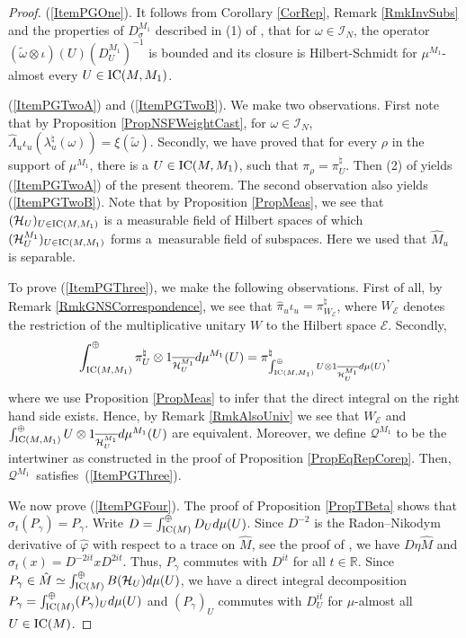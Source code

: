 \documentclass[pdftex]{sigma}
\numberwithin{equation}{section}
\theoremstyle{definition}
\newcommand{\cHil}{\mathcal{H}}
\newcommand{\ICM}{\text{\rm IC}(M)}
\newcommand{\ICMM}{\text{\rm IC}(M, M_1)}
\begin{document}
\begin{proof}
(\ref{ItemPGOne}). It follows from  Corollary \ref{CorRep}, Remark \ref{RmkInvSubs} and the properties of $D_\sigma^{M_1}$ described in (1) of \cite[Theorem 3.4.5]{Des}, that for $\omega \in \mathcal{I}_N$, the operator $(\tilde{\omega} \otimes \iota)(U) (D_U^{M_1})^{-1}$ is bounded and its closure is Hilbert-Schmidt for $\mu^{M_1}$-almost every $U \in \ICMM$.

(\ref{ItemPGTwoA}) and (\ref{ItemPGTwoB}). We make two observations. First note that by  Proposition \ref{PropNSFWeightCast}, for $\omega \in \mathcal{I}_N$,
$
\hat{\Lambda}_u \iota_u( \lambda_u^\natural(\omega))  = \xi(\tilde{\omega}).
$
Secondly, we have proved that for every $\rho$ in the support of $\mu^{M_1}$, there is a $U \in \ICMM$, such that $\pi_\rho = \pi_U^\natural$. Then (2) of \cite[Theorem 3.4.5]{Des} yields (\ref{ItemPGTwoA}) of the present theorem. The second observation also yields (\ref{ItemPGTwoB}). Note that by Proposition \ref{PropMeas}, we see that $(\cHil_U)_{U \in \ICMM}$ is a measurable f\/ield of Hilbert spaces of which $(\cHil_U^{M_1})_{U \in \ICMM}$ forms a~measurable f\/ield of subspaces. Here we used that $\hat{M}_u$ is separable.


To prove (\ref{ItemPGThree}), we make the following observations. First of all, by Remark \ref{RmkGNSCorrespondence}, we see that $\hat{\pi}_u \iota_u = \pi_{W_{\mathcal{E}}}^\natural$, where $W_{\mathcal{E}}$ denotes the restriction of the multiplicative unitary $W$ to the Hilbert space $\mathcal{E}$. Secondly,
\[
\int_{\ICMM}^\oplus  \pi_U^\natural \otimes 1_{ \overline{ \cHil_U^{M_1}}} d\mu^{M_1}(U) =
\pi_{\int^\oplus_{\ICMM} U \otimes 1_{\overline{\cHil_U^{M_1}}} d\mu(U)}^\natural,
\]
where we use Proposition \ref{PropMeas} to infer that the direct integral on the right hand side exists.
Hence, by Remark \ref{RmkAlsoUniv} we see that $W_\mathcal{E}$ and $\int^\oplus_{\ICMM} U \otimes 1_{\overline{\cHil_U^{M_1}}} d\mu^{M_1}(U)$ are equivalent. Moreover, we def\/ine $\mathcal{Q}^{M_1}$ to be the intertwiner as constructed in the proof of Proposition \ref{PropEqRepCorep}. Then, $\mathcal{Q}^{M_1}$~satisf\/ies~(\ref{ItemPGThree}).

We now prove (\ref{ItemPGFour}). The proof of Proposition \ref{PropTBeta} shows that $\hat{\sigma}_t(P_\gamma) = P_\gamma$.
Write $D = \int_{\ICM} ^\oplus D_U d\mu(U)$. Since $D^{-2}$ is the Radon--Nikodym derivative of $\hat{\varphi}$ with respect to a trace on $\hat{M}$, see the proof of \cite[Theorem 3.4.5]{Des}, we have $D \eta \hat{M}$ and $\hat{\sigma}_t(x) = D^{-2it} x D^{2it}$. Thus,  $P_\gamma$ commutes with $D^{it}$ for all $t \in \mathbb{R}$. Since $P_\gamma \in \hat{M} \simeq \int^\oplus_{\ICM} B(\cHil_U) d\mu(U)$, we have a direct integral decomposition $P_\gamma = \int_{\ICM}^\oplus (P_\gamma)_U d\mu(U)$ and $(P_\gamma)_U$ commutes with $D_U^{it}$ for $\mu$-almost all $U \in \ICM$.



\end{proof}
\end{document}
